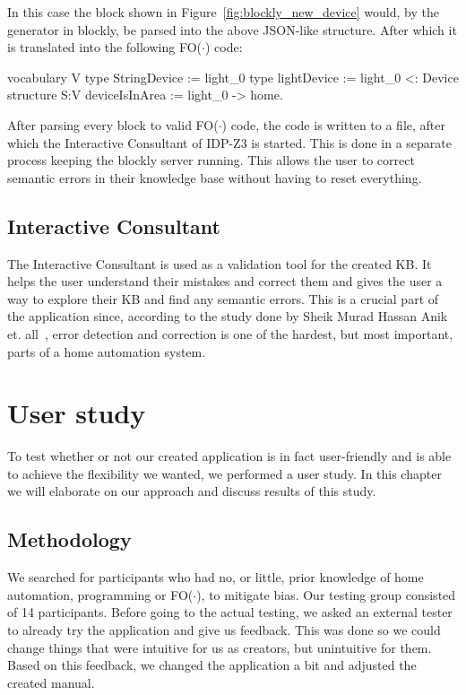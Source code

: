 \documentclass[11pt,a4paper]{report}
\newcommand{\fodot}{FO($\cdot$)\xspace}
\begin{document}
\begin{idplisting}
In this case the block shown in Figure~\ref{fig:blockly_new_device} would, by the generator in blockly, be parsed into the above JSON-like structure. After which it is translated into the following \fodot code:

\begin{idplisting}
vocabulary V {
    type StringDevice := {light_0}
    type lightDevice := {light_0} <: Device
}
structure S:V {
    deviceIsInArea := {light_0 -> home}.
}
\end{idplisting}

After parsing every block to valid \fodot code, the code is written to a file, after which the Interactive Consultant of IDP-Z3 is started. This is done in a separate process keeping the blockly server running. This allows the user to correct semantic errors in their knowledge base without having to reset everything.

\section{Interactive Consultant}
The Interactive Consultant is used as a validation tool for the created KB. It helps the user understand their mistakes and correct them and gives the user a way to explore their KB and find any semantic errors. This is a crucial part of the application since, according to the study done by Sheik Murad Hassan Anik et. all~\cite{SOTA_AutomationConfigurationSmarthome}, error detection and correction is one of the hardest, but most important, parts of a home automation system.

\chapter{User study}
To test whether or not our created application is in fact user-friendly and is able to achieve the flexibility we wanted, we performed a user study. In this chapter we will elaborate on our approach and discuss results of this study.

\section{Methodology}
We searched for participants who had no, or little, prior knowledge of home automation, programming or \fodot, to mitigate bias. Our testing group consisted of 14 participants. Before going to the actual testing, we asked an external tester to already try the application and give us feedback. This was done so we could change things that were intuitive for us as creators, but unintuitive for them. Based on this feedback, we changed the application a bit and adjusted the created manual.


\end{idplisting}
\end{document}
